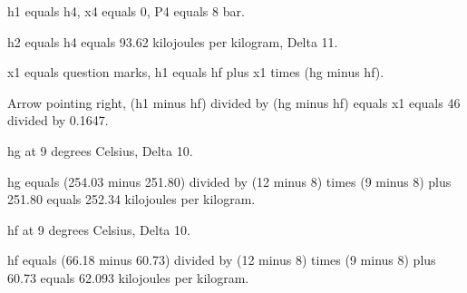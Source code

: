 h1 equals h4, x4 equals 0, P4 equals 8 bar.

h2 equals h4 equals 93.62 kilojoules per kilogram, Delta 11.

x1 equals question marks, h1 equals hf plus x1 times (hg minus hf).

Arrow pointing right, (h1 minus hf) divided by (hg minus hf) equals x1 equals 46 divided by 0.1647.

hg at 9 degrees Celsius, Delta 10.

hg equals (254.03 minus 251.80) divided by (12 minus 8) times (9 minus 8) plus 251.80 equals 252.34 kilojoules per kilogram.

hf at 9 degrees Celsius, Delta 10.

hf equals (66.18 minus 60.73) divided by (12 minus 8) times (9 minus 8) plus 60.73 equals 62.093 kilojoules per kilogram.